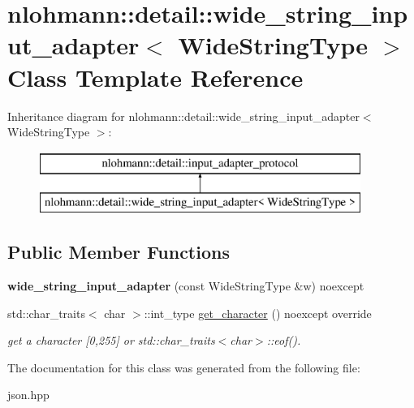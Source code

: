 \hypertarget{classnlohmann_1_1detail_1_1wide__string__input__adapter}{}\section{nlohmann\+:\+:detail\+:\+:wide\+\_\+string\+\_\+input\+\_\+adapter$<$ Wide\+String\+Type $>$ Class Template Reference}
\label{classnlohmann_1_1detail_1_1wide__string__input__adapter}
Inheritance diagram for nlohmann\+:\+:detail\+:\+:wide\+\_\+string\+\_\+input\+\_\+adapter$<$ Wide\+String\+Type $>$\+:\begin{figure}[H]
\begin{center}
\leavevmode
\includegraphics[height=2.000000cm]{classnlohmann_1_1detail_1_1wide__string__input__adapter}
\end{center}
\end{figure}
\subsection*{Public Member Functions}
\begin{DoxyCompactItemize}
\item 
\mbox{\label{classnlohmann_1_1detail_1_1wide__string__input__adapter_a85c8bddae20bc00d64dd7a2c87109357}} 
{\bfseries wide\+\_\+string\+\_\+input\+\_\+adapter} (const Wide\+String\+Type \&w) noexcept
\item 
\mbox{\label{classnlohmann_1_1detail_1_1wide__string__input__adapter_abb62b34cf77e557ce5321b7f2490c3b0}} 
std\+::char\+\_\+traits$<$ char $>$\+::int\+\_\+type \mbox{\hyperlink{classnlohmann_1_1detail_1_1wide__string__input__adapter_abb62b34cf77e557ce5321b7f2490c3b0}{get\+\_\+character}} () noexcept override
\begin{DoxyCompactList}\small\item\em get a character \mbox{[}0,255\mbox{]} or std\+::char\+\_\+traits$<$char$>$\+::eof(). \end{DoxyCompactList}\end{DoxyCompactItemize}


The documentation for this class was generated from the following file\+:\begin{DoxyCompactItemize}
\item 
json.\+hpp\end{DoxyCompactItemize}
